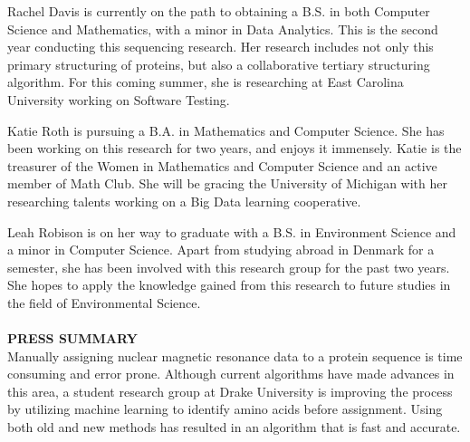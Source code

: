 \documentclass{article}
\begin{document}
\noindent Rachel Davis is currently on the path to obtaining a B.S. in both Computer Science and Mathematics, with a minor in Data Analytics. This is the second year conducting this sequencing research. Her research includes not only this primary structuring of proteins, but also a collaborative tertiary structuring algorithm. For this coming summer, she is researching at East Carolina University working on Software Testing.

\noindent Katie Roth is pursuing a B.A. in Mathematics and Computer Science. She has been working on this research for two years, and enjoys it immensely. Katie is the treasurer of the Women in Mathematics and Computer Science and an active member of Math Club. She will be gracing the University of Michigan with her researching talents working on a Big Data learning cooperative.

\noindent Leah Robison is on her way to graduate with a B.S. in Environment Science and a minor in Computer Science. Apart from studying abroad in Denmark for a semester, she has been involved with this research group for the past two years. She hopes to apply the knowledge gained from this research to future studies in the field of Environmental Science.
\\\\
\noindent\textbf{PRESS SUMMARY}\\
Manually assigning nuclear magnetic resonance data to a protein sequence is time consuming and error prone. Although current algorithms have made advances in this area, a student research group at Drake University is improving the process by utilizing machine learning to identify amino acids before assignment. Using both old and new methods has resulted in an algorithm that is fast and accurate. 
\end{document}

